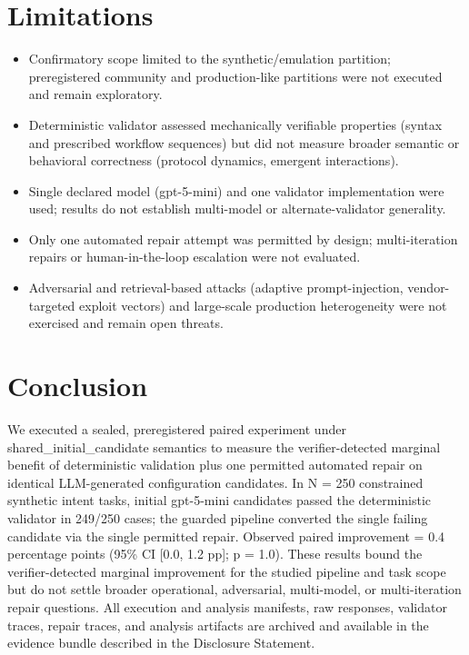 \documentclass[conference]{IEEEtran}
\begin{document}
\section{Limitations}
\begin{itemize}
\item Confirmatory scope limited to the synthetic/emulation partition; preregistered community and production-like partitions were not executed and remain exploratory.
\item Deterministic validator assessed mechanically verifiable properties (syntax and prescribed workflow sequences) but did not measure broader semantic or behavioral correctness (protocol dynamics, emergent interactions).
\item Single declared model (gpt-5-mini) and one validator implementation were used; results do not establish multi-model or alternate-validator generality.
\item Only one automated repair attempt was permitted by design; multi-iteration repairs or human-in-the-loop escalation were not evaluated.
\item Adversarial and retrieval-based attacks (adaptive prompt-injection, vendor-targeted exploit vectors) and large-scale production heterogeneity were not exercised and remain open threats.
\end{itemize}

\section{Conclusion}
We executed a sealed, preregistered paired experiment under shared\_initial\_candidate semantics to measure the verifier-detected marginal benefit of deterministic validation plus one permitted automated repair on identical LLM-generated configuration candidates. In N = 250 constrained synthetic intent tasks, initial gpt-5-mini candidates passed the deterministic validator in 249/250 cases; the guarded pipeline converted the single failing candidate via the single permitted repair. Observed paired improvement = 0.4 percentage points (95\% CI [0.0, 1.2 pp]; p = 1.0). These results bound the verifier-detected marginal improvement for the studied pipeline and task scope but do not settle broader operational, adversarial, multi-model, or multi-iteration repair questions. All execution and analysis manifests, raw responses, validator traces, repair traces, and analysis artifacts are archived and available in the evidence bundle described in the Disclosure Statement.
\end{document}
